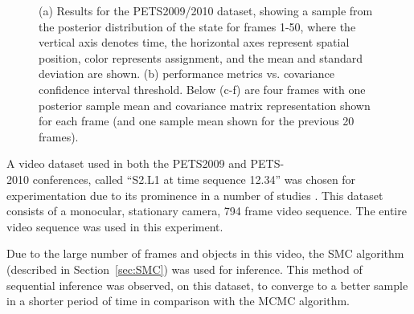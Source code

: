 \documentclass[twocolumn, final]{svjour3}
\begin{document}
\begin{figure}[!]
   \hspace{1pt}
  \caption{ (a) Results for the PETS2009/2010 dataset, showing a sample from the posterior distribution of the state for frames 1-50, where the vertical axis denotes time, the horizontal axes represent spatial position, color represents assignment, and the mean and standard deviation are shown. (b) performance metrics vs. covariance confidence interval threshold. Below (c-f) are four frames with one posterior sample mean and covariance matrix representation shown for each frame (and one sample mean shown for the previous 20 frames).}
  \label{fig:pets2009_results}
\end{figure}

A video dataset used in both the PETS2009 and PETS-\\2010 conferences, called ``S2.L1 at time sequence 12.34'' was chosen for experimentation due to its prominence in a number of studies \cite{ellis_2010,arsic2009multi,berclaz2009multiple,conte2010performance,bolme2009simple,breitenstein2009markovian,ge2009evaluation,alahi2009sparsity,yang2009probabilistic}. This dataset consists of a monocular, stationary camera, 794 frame video sequence. The entire video sequence was used in this experiment. 

Due to the large number of frames and objects in this video, the SMC algorithm (described in Section~\ref{sec:SMC}) was used for inference. This method of sequential inference was observed, on this dataset, to converge to a better sample in a shorter period of time in comparison with the MCMC algorithm.
\end{document}
